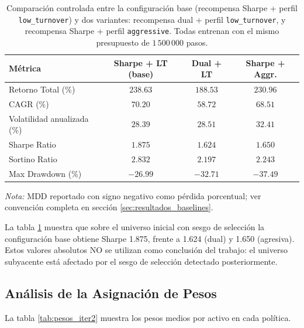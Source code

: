 \documentclass[IB,a4paper]{TFUOC}
\begin{document}
\begin{table}[h]
\centering
\renewcommand{\arraystretch}{1.25}
\begin{tabular}{|l|c|c|c|}
\hline
\textbf{Métrica} & \textbf{Sharpe + LT (base)} & \textbf{Dual + LT} & \textbf{Sharpe + Aggr.} \\ \hline
Retorno Total (\%)        & $\mathbf{238.63}$ & $188.53$ & $230.96$ \\ \hline
CAGR (\%)                 & $\mathbf{70.20}$  & $58.72$  & $68.51$  \\ \hline
Volatilidad anualizada (\%) & $\mathbf{28.39}$ & $28.51$  & $32.41$  \\ \hline
Sharpe Ratio              & $\mathbf{1.875}$  & $1.624$  & $1.650$  \\ \hline
Sortino Ratio             & $\mathbf{2.832}$  & $2.197$  & $2.243$  \\ \hline
Max Drawdown (\%)         & $\mathbf{-26.99}$ & $-32.71$ & $-37.49$ \\ \hline
\end{tabular}
\caption[Ablación iteración 1: base vs. dual vs. agresiva (universo inicial con sesgo de selección, $n=15$).]{Comparación controlada entre la configuración base (recompensa Sharpe + perfil \texttt{low\_turnover}) y dos variantes: recompensa dual + perfil \texttt{low\_turnover}, y recompensa Sharpe + perfil \texttt{aggressive}. Todas entrenan con el mismo presupuesto de $1\,500\,000$ pasos.}
\label{tab:resultados_iter2}
\end{table}

\noindent\textit{Nota:} MDD reportado con signo negativo como pérdida porcentual; ver convención completa en sección \ref{sec:resultados_baselines}.

\noindent La tabla \ref{tab:resultados_iter2} muestra que sobre el universo inicial con sesgo de selección la configuración base obtiene Sharpe 1.875, frente a 1.624 (dual) y 1.650 (agresiva). Estos valores absolutos NO se utilizan como conclusión del trabajo: el universo subyacente está afectado por el sesgo de selección detectado posteriormente.

\subsection{Análisis de la Asignación de Pesos}

La tabla \ref{tab:pesos_iter2} muestra los pesos medios por activo en cada política.
\end{document}
